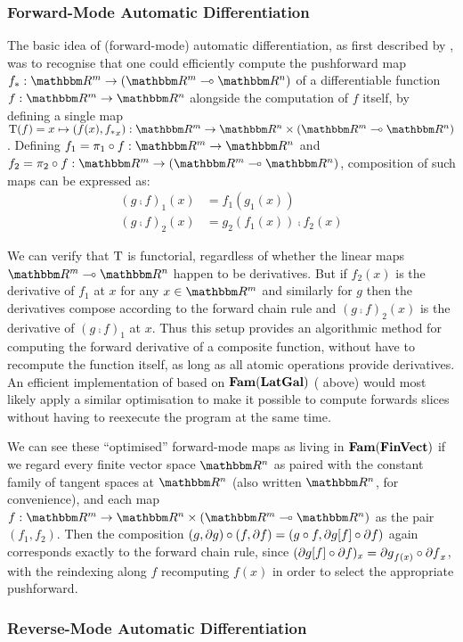 \subsubsection{Forward-Mode Automatic Differentiation}

The basic idea of (forward-mode) automatic differentiation, as first described by \citet{linnainmaa76}, was to
recognise that one could efficiently compute the pushforward map $\pushf{f}: \RR^m \to (\RR^m \linearto
\RR^n)$ of a differentiable function $f: \RR^m \to \RR^n$ alongside the computation of $f$ itself, by defining
a single map $\tangents(f) = x \mapsto (f(x), \pushf{f}_x): \RR^m \to \RR^n \times (\RR^m \linearto \RR^n)$.
Defining $f_1 = \pi_1 \comp f: \RR^m \to \RR^n$ and $f_2 = \pi_2 \comp f: \RR^m \to (\RR^m \linearto \RR^n)$,
composition of such maps can be expressed as:
\begin{align*}
(g \comp f)_1(x) &= f_1(g_1(x)) \\
(g \comp f)_2(x) &= g_2(f_1(x)) \comp f_2(x)
\end{align*}

We can verify that $\mathrm{T}$ is functorial, regardless of whether the linear maps $\RR^m \linearto \RR^n$
happen to be derivatives. But if $f_2(x)$ is the derivative of $f_1$ at $x$ for any $x \in \RR^m$ and
similarly for $g$ then the derivatives compose according to the forward chain rule and $(g \comp f)_2(x)$ is
the derivative of $(g \comp f)_1$ at $x$. Thus this setup provides an algorithmic method for computing the
forward derivative of a composite function, without have to recompute the function itself, as long as all
atomic operations provide derivatives. An efficient implementation of \GPS based on $\mathbf{Fam}(\mathbf{LatGal})$
( above) would most likely apply a similar optimisation to make it possible to
compute forwards slices without having to reexecute the program at the same time.

We can see these ``optimised'' forward-mode maps as living in $\mathbf{Fam}(\mathbf{FinVect})$ if we regard every finite
vector space $\RR^n$ as paired with the constant family of tangent spaces at $\RR^n$ (also written $\RR^n$,
for convenience), and each map $f: \RR^m \to \RR^n \times (\RR^m \linearto \RR^n)$ as the pair $(f_1, f_2)$.
Then the composition $(g, \partial g) \circ (f, \partial f) = (g \circ f, \partial g[f] \circ
\partial f)$ again corresponds exactly to the forward chain rule, since $(\partial g[f] \circ
\partial f)_x = {\partial g}_{f(x)} \circ {\partial f}_x$, with the reindexing along $f$ recomputing $f(x)$ in
order to select the appropriate pushforward.

\subsubsection{Reverse-Mode Automatic Differentiation}

